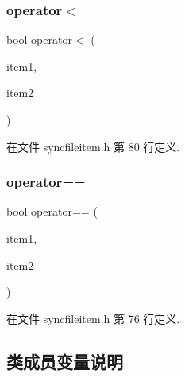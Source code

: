 \subsubsection{\texorpdfstring{operator$<$}{operator<}}
{\footnotesize\ttfamily bool operator$<$ (\begin{DoxyParamCaption}\item[{const \hyperlink{class_o_c_c_1_1_sync_file_item}{Sync\+File\+Item} \&}]{item1,  }\item[{const \hyperlink{class_o_c_c_1_1_sync_file_item}{Sync\+File\+Item} \&}]{item2 }\end{DoxyParamCaption})\hspace{0.3cm}{\ttfamily [friend]}}



在文件 syncfileitem.\+h 第 80 行定义.

\mbox{\label{class_o_c_c_1_1_sync_file_item_a6c22b37e5da92ad2e7655c43fce5f335}} 
\subsubsection{\texorpdfstring{operator==}{operator==}}
{\footnotesize\ttfamily bool operator== (\begin{DoxyParamCaption}\item[{const \hyperlink{class_o_c_c_1_1_sync_file_item}{Sync\+File\+Item} \&}]{item1,  }\item[{const \hyperlink{class_o_c_c_1_1_sync_file_item}{Sync\+File\+Item} \&}]{item2 }\end{DoxyParamCaption})\hspace{0.3cm}{\ttfamily [friend]}}



在文件 syncfileitem.\+h 第 76 行定义.



\subsection{类成员变量说明}
\mbox{\label{class_o_c_c_1_1_sync_file_item_aba64206e59dcf5d053875d2692d3bb21}} 
